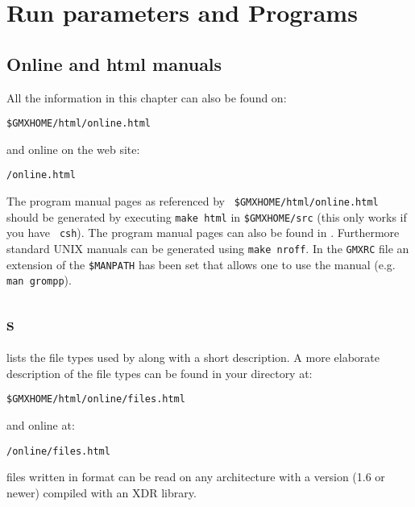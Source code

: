 %
% 
% 
% 
% 
% 
% 
% 
% 
%

\chapter{Run parameters and Programs}
\label{ch:programs}

\section{Online and html manuals}
All the information in this chapter can also be found on:\\
\centerline{\tt \$GMXHOME/html/online.html}
and online on the {\gromacs} web site:\\
\centerline{\tt \wwwpage/online\gmxver.html}
The program manual pages as referenced by {\tt
\$GMXHOME/html/online.html} should be generated by executing {\tt make
html} in {\tt \$GMXHOME/src} (this only works if you have {\tt
csh}). The program manual pages can also be found in
. Furthermore standard UNIX manuals can be generated using
{\tt make nroff}. In the {\tt GMXRC} file an extension of the {\tt \$MANPATH} 
has been set that allows one to use the manual (e.g. {\tt man grompp}).

\section{s}
\label{sec:fileformats}
 lists the file types used by {\gromacs} along with
a short description. A more elaborate description of the file types can
be found in your {\gromacs} directory at:\\
\centerline{\tt \$GMXHOME/html/online/files.html}
and online at:\\
\centerline{\tt {\wwwpage}/online\gmxver/files.html}

{\gromacs} files written in  format can be read on any
architecture with a {\gromacs} version (1.6 or newer) compiled with an
XDR library.


